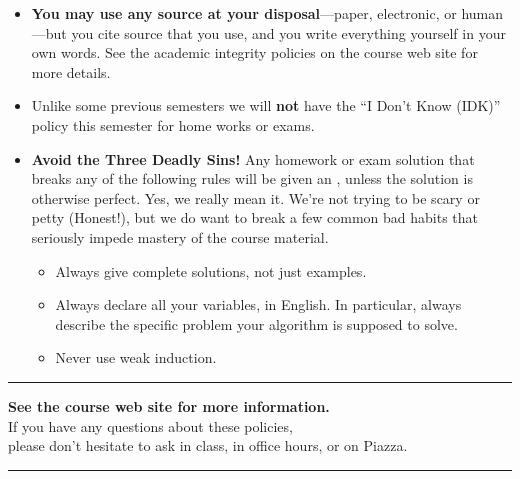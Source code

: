 \documentclass[11pt]{article}
\begin{document}
\begin{itemize}
\item \textbf{You may use any source at your disposal}—paper,
  electronic, or human—but you  cite  source
  that you use, and you  write everything yourself in your
  own words.  See the academic integrity policies on the course web
  site for more details.

\item Unlike some previous semesters we will \textbf{not} have the ``I
  Don't Know (IDK)'' policy this semester for home works or exams. 

\item \textbf{Avoid the Three Deadly Sins!}  Any homework or exam
  solution that breaks any of the following rules will be given an
  \textcolor{Red}{}, unless the solution is
  otherwise perfect.  Yes, we really mean it.  We’re not trying to be
  scary or petty (Honest!), but we do want to break a few common bad
  habits that seriously impede mastery of the course material.
\begin{itemize}\itemsep0pt
\item Always give complete solutions, not just examples.
\item Always declare all your variables, in English.  In particular, always describe the specific problem your algorithm is supposed to solve.
\item Never use weak induction.
\end{itemize}

\end{itemize}
\bigskip
\hrule

\begin{center}
\large \textbf{See the course web site for more information.}\\[1ex]\normalsize
If you have any questions about these policies,\\
please don’t hesitate to ask in class, in office hours, or on Piazza.
\end{center}

\hrule
\vfil
\vfil
\vfil

\noindent
\end{document}
